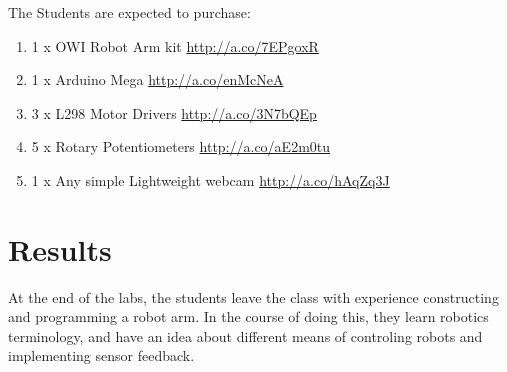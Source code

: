 The Students are expected to purchase:
\begin{enumerate}
\item 1 x OWI Robot Arm kit \url{http://a.co/7EPgoxR}
\item 1 x Arduino Mega \url{http://a.co/enMcNeA}
\item 3 x L298 Motor Drivers \url{http://a.co/3N7bQEp}
\item 5 x Rotary Potentiometers \url{http://a.co/aE2m0tu}
\item 1 x Any simple Lightweight webcam \url{http://a.co/hAqZq3J}
\end{enumerate}




\section{Results}

At the end of the labs, the students leave the class with experience constructing and programming a robot arm. In the course of doing this, they learn robotics terminology, and have an idea about different means of controling robots and implementing sensor feedback. 
